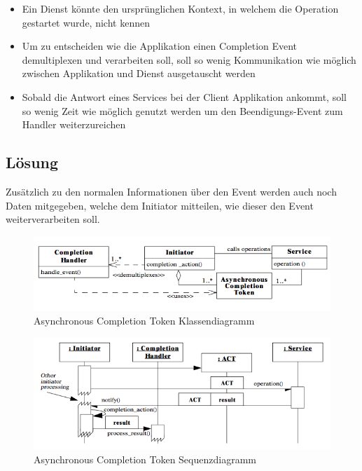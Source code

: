 \begin{itemize}
	\item Ein Dienst könnte den ursprünglichen Kontext, in welchem die Operation gestartet wurde, nicht kennen
	\item Um zu entscheiden wie die Applikation einen Completion Event demultiplexen und verarbeiten soll, soll so wenig Kommunikation wie möglich zwischen Applikation und Dienst ausgetauscht werden
	\item Sobald die Antwort eines Services bei der Client Applikation ankommt, soll so wenig Zeit wie möglich genutzt werden um den Beendigungs-Event zum Handler weiterzureichen
\end{itemize}


\subsection{Lösung}

Zusätzlich zu den normalen Informationen über den Event werden auch noch Daten mitgegeben, welche dem Initiator mitteilen, wie dieser den Event weiterverarbeiten soll.

\begin{figure}[H]
	\centering
	\includegraphics[width=12cm]{content/posa2/asynchronous-completion-token/images/class-diagram.png}
	\caption{Asynchronous Completion Token Klassendiagramm}
\end{figure}



\begin{figure}[H]
	\centering
	\includegraphics[width=12cm]{content/posa2/asynchronous-completion-token/images/ssd.png}
	\caption{Asynchronous Completion Token Sequenzdiagramm}
\end{figure}



